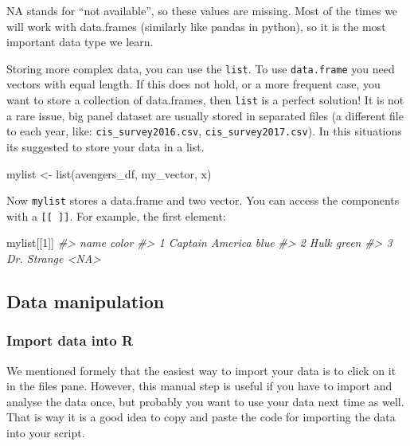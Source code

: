 \documentclass[
]{article}
\newenvironment{Shaded}{\begin{snugshade}}{\end{snugshade}}
\newcommand{\CommentTok}[1]{\textcolor[rgb]{0.56,0.35,0.01}{\textit{#1}}}
\newcommand{\DecValTok}[1]{\textcolor[rgb]{0.00,0.00,0.81}{#1}}
\newcommand{\FunctionTok}[1]{\textcolor[rgb]{0.00,0.00,0.00}{#1}}
\newcommand{\NormalTok}[1]{#1}
\newcommand{\OtherTok}[1]{\textcolor[rgb]{0.56,0.35,0.01}{#1}}
\begin{document}
NA stands for ``not available'', so these values are missing. Most of the times we will work with data.frames (similarly like pandas in python), so it is the most important data type we learn.

Storing more complex data, you can use the \texttt{list}. To use \texttt{data.frame} you need vectors with equal length. If this does not hold, or a more frequent case, you want to store a collection of data.frames, then \texttt{list} is a perfect solution! It is not a rare issue, big panel dataset are usually stored in separated files (a different file to each year, like: \texttt{cis\_survey2016.csv}, \texttt{cis\_survey2017.csv}). In this situations its suggested to store your data in a list.

\begin{Shaded}
\begin{Highlighting}[]
\NormalTok{mylist }\OtherTok{\textless{}{-}} \FunctionTok{list}\NormalTok{(avengers\_df, my\_vector, x)}
\end{Highlighting}
\end{Shaded}

Now \texttt{mylist} stores a data.frame and two vector. You can access the components with a \texttt{{[}{[}\ {]}{]}}. For example, the first element:

\begin{Shaded}
\begin{Highlighting}[]
\NormalTok{mylist[[}\DecValTok{1}\NormalTok{]]}
\CommentTok{\#\textgreater{}              name color}
\CommentTok{\#\textgreater{} 1 Captain America  blue}
\CommentTok{\#\textgreater{} 2            Hulk green}
\CommentTok{\#\textgreater{} 3     Dr. Strange  \textless{}NA\textgreater{}}
\end{Highlighting}
\end{Shaded}

\hypertarget{data-manipulation}{%
\subsection{Data manipulation}\label{data-manipulation}}

\hypertarget{data-import}{%
\subsubsection{Import data into R}\label{data-import}}

We mentioned formely that the easiest way to import your data is to click on it in the files pane. However, this manual step is useful if you have to import and analyse the data once, but probably you want to use your data next time as well. That is way it is a good idea to copy and paste the code for importing the data into your script.
\end{document}
